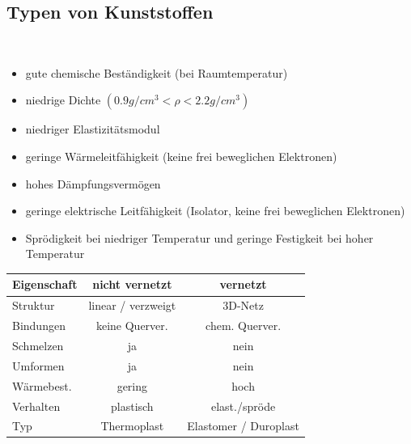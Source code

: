 \documentclass[8.5pt,twocolumn]{extarticle}
\begin{document}
    \subsection{Typen von Kunststoffen}\mbox{}\\
    \begin{itemize}[label={}, leftmargin=*,  itemsep=0.01em]
        \item gute chemische Beständigkeit (bei Raumtemperatur)
        \item niedrige Dichte $(0.9 g/cm^3 < \rho < 2.2 g/cm^3 )$
        \item niedriger Elastizitätsmodul
        \item geringe Wärmeleitfähigkeit (keine frei beweglichen Elektronen)
        \item hohes Dämpfungsvermögen
        \item geringe elektrische Leitfähigkeit (Isolator, keine frei beweglichen Elektronen)
        \item Sprödigkeit bei niedriger Temperatur und geringe Festigkeit bei hoher
        Temperatur
    \end{itemize}
    \begin{center}
        \small
        \begin{tabular}{|l|c|c|}
            \hline
            \textbf{Eigenschaft} & \textbf{nicht vernetzt} & \textbf{vernetzt} \\
            \hline
            Struktur & linear / verzweigt & 3D-Netz \\
            \hline
            Bindungen & keine Querver. & chem. Querver. \\
            \hline
            Schmelzen & ja & nein \\
            \hline
            Umformen & ja & nein \\
            \hline
            Wärmebest. & gering & hoch \\
            \hline
            Verhalten & plastisch & elast./spröde \\
            \hline
            Typ & Thermoplast & Elastomer / Duroplast \\
            \hline
        \end{tabular}
    \end{center}
\end{document}
